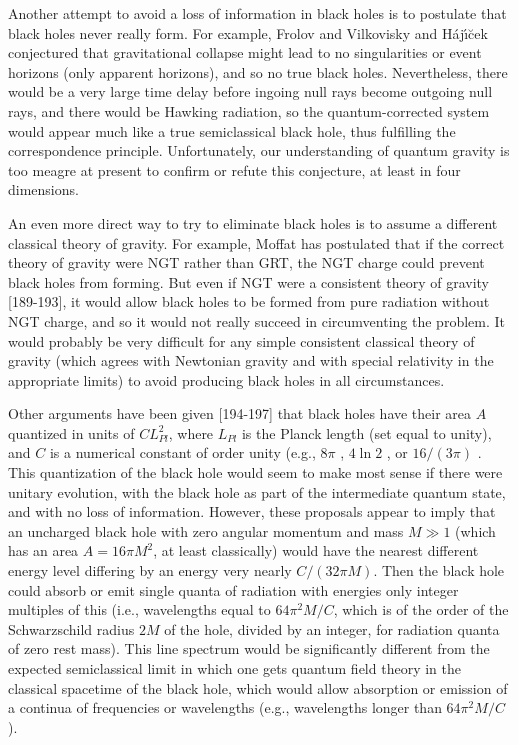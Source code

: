 \documentclass[12pt]{article}
\begin{document}
     Another attempt to avoid a loss of information in black holes is
to
postulate that black holes never really form.  For example, Frolov
and
Vilkovisky \cite{FV79,FV81} and H\'{a}j\'{\i}\u{c}ek
\cite{Haj86,Haj87}
conjectured that gravitational collapse might lead to no
singularities or
event horizons (only apparent horizons), and so no true black holes.
Nevertheless, there would be a very large time delay before ingoing
null rays become outgoing null rays, and there would be Hawking
radiation,
so the quantum-corrected system would appear much like a
true semiclassical black hole, thus fulfilling the correspondence
principle.
Unfortunately, our understanding of quantum gravity is too meagre
at present to confirm or refute this conjecture, at least in four
dimensions.

     An even more direct way to try to eliminate black holes is to
assume
a different classical theory of gravity.  For example, Moffat
\cite{Mof93,Mof93b} has postulated that if the correct theory of
gravity
were NGT rather than GRT, the NGT charge could prevent black holes
from forming.  But even if NGT were
a consistent theory of gravity [189-193],
it would allow black holes to be formed from pure radiation without
NGT
charge, and so it would not really succeed in circumventing the
problem.
It would probably be very difficult for any simple consistent
classical theory
of gravity (which agrees with Newtonian gravity and with special
relativity
in the appropriate limits) to avoid producing black holes in all
circumstances.

     Other arguments have been given [194-197] that
black holes have their area $A$ quantized in units of $CL_{Pl}^2$,
where $L_{Pl}$ is the Planck length (set equal to unity), and $C$ is
a numerical constant of order unity (e.g., $8\pi$ \cite{Bek74b},
$4\ln 2$ \cite{Muk,GarBel},
or $16/(3\pi)$ \cite{Peleg}.  This quantization of the black hole
would seem
to make
most sense if there were unitary evolution, with the black hole as
part of the
intermediate quantum state, and with no loss of information.
However, these
proposals appear to imply \cite{Muk} that an uncharged black hole
with zero
angular momentum and mass $M\gg 1$ (which has an area $A=16\pi M^2$,
at least classically) would have the nearest different energy level
differing
by
an energy very nearly $C/(32\pi M)$.  Then the black hole could
absorb or emit
single quanta of radiation with energies only integer multiples of
this
(i.e., wavelengths equal to $64\pi^2 M/C$, which is of the order of
the
Schwarzschild radius $2M$ of the hole, divided by an integer, for
radiation
quanta of zero rest mass).  This line spectrum \cite{Muk} would be
significantly different from the
expected semiclassical limit in which one gets quantum field theory
in the
classical spacetime of the black hole, which would allow absorption
or
emission of a continua of frequencies or wavelengths (e.g.,
wavelengths
longer than $64\pi^2 M/C$).
\end{document}
